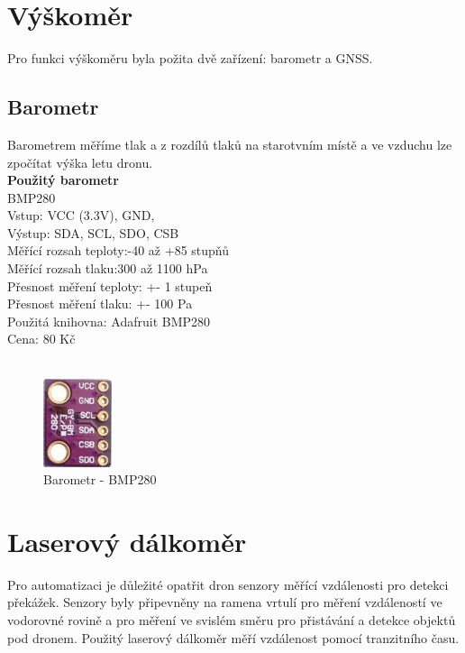 \section{Výškoměr}
Pro funkci výškoměru byla požita dvě zařízení: barometr a GNSS.

\subsection{Barometr}
Barometrem měříme tlak a z rozdílů tlaků na starotvním místě a ve vzduchu lze zpočítat výška letu dronu.\\

\textbf{Použitý barometr}\\
BMP280\\
Vstup: VCC (3.3V), GND,\\
Výstup: SDA, SCL, SDO, CSB\\
Měřící rozsah teploty:-40 až +85 stupňů\\
Měřící rozsah tlaku:300 až 1100 hPa\\
Přesnost měření teploty: +- 1 stupeň\\
Přesnost měření tlaku:  +- 100 Pa\\
Použitá knihovna: Adafruit BMP280\\
Cena: 80 Kč\\
\cite{bpm}\\

\begin{figure}[H]
	\centering
	\includegraphics[width=2cm]{pictures/baro.jpg}
	\caption{Barometr - BMP280}
\end{figure}

\section{Laserový dálkoměr}
Pro automatizaci je důležité opatřit dron senzory měřící vzdálenosti pro detekci překážek. Senzory byly připevněny na ramena vrtulí pro měření vzdáleností ve vodorovné rovině a pro měření ve svislém směru pro přistávání a detekce objektů pod dronem. Použitý laserový dálkoměr měří vzdálenost pomocí tranzitního času.\\

